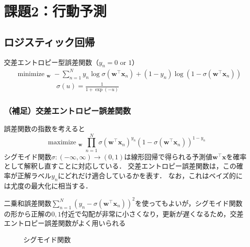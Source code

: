 \documentclass[a4paper,lualatex,ja=standard,oneside,fleqn]{bxjsarticle}
\DeclareMathOperator*{\minimize}{minimize\ }
\DeclareMathOperator*{\maximize}{maximize\ }
\begin{document}
\section{課題2：行動予測}
\subsection{ロジスティック回帰}
交差エントロピー型誤差関数（$y_n=0$ or $1$）
\begin{align*}
  &\minimize_{\bm{w}} -\sum_{n=1}^N y_n\log\sigma(\bm{w}^\top\bm{x}_n) + (1-y_n)\log(1-\sigma(\bm{w}^\top\bm{x}_n))\\
  &\qquad\qquad\qquad\sigma(u) = \frac{1}{1+\exp(-u)}
\end{align*}
\subsubsection*{（補足）交差エントロピー誤差関数}
誤差関数の指数を考えると
\begin{equation*}
  \maximize_{\bm{w}}\prod_{n=1}^N\sigma(\bm{w}^\top\bm{x}_n)^{y_n}(1-\sigma(\bm{w}^\top\bm{x}_n))^{1-y_n}
\end{equation*}
シグモイド関数$\sigma:(-\infty,\infty)\to(0,1)$は線形回帰で得られる予測値$\bm{w}^\top\bm{x}$を確率として解釈し直すことに対応している．
交差エントロピー誤差関数は，この確率が正解ラベル$y_n$にどれだけ適合しているかを表す．
なお，これはベイズ的には尤度の最大化に相当する．

二乗和誤差関数$\sum_{n=1}^N(y_n-\sigma(\bm{w}^\top\bm{x}_n))^2$を使ってもよいが，シグモイド関数の形から正解の$0,1$付近で勾配が非常に小さくなり，更新が遅くなるため，交差エントロピー誤差関数がよく用いられる
\begin{figure}[htbp]
  \centering
  
  \caption{シグモイド関数}
  \label{fig:sigmoid}
\end{figure}
\end{document}
